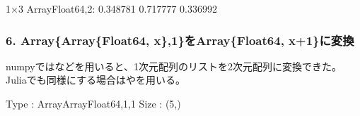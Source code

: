 \documentclass[letterpaper,10pt,english]{sphinxmanual}
\begin{document}
\begin{sphinxVerbatim}[commandchars=\\\{\}]
1×3 Array\PYGZob{}Float64,2\PYGZcb{}:
 0.348781  0.717777  0.336992
\end{sphinxVerbatim}


\subsubsection{6. Array\{Array\{Float64, x\},1\}をArray\{Float64, x+1\}に変換}
\label{\detokenize{tips:array-array-float64-x-1-array-float64-x-1}}
numpyではなどを用いると、1次元配列のリストを2次元配列に変換できた。Juliaでも同様にする場合はやを用いる。

\begin{sphinxVerbatim}[commandchars=\\\{\}]
  \PYG{p}{[}  \PYG{p}{]}

 
 
\end{sphinxVerbatim}

\begin{sphinxVerbatim}[commandchars=\\\{\}]
Type : Array\PYGZob{}Array\PYGZob{}Float64,1\PYGZcb{},1\PYGZcb{}
Size : (5,)
\end{sphinxVerbatim}

\begin{sphinxVerbatim}[commandchars=\\\{\}]
  

 
 
\end{sphinxVerbatim}
\end{document}

